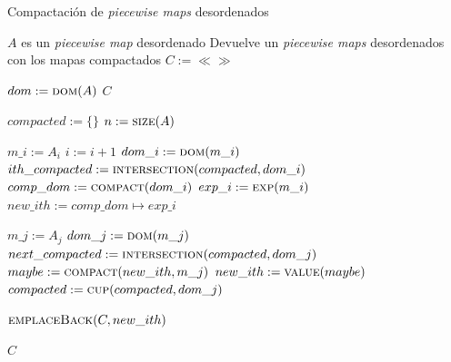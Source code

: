 \begin{algorithm}
\caption{Compactación de \textit{piecewise maps} desordenados}
\label{alg:compact}
\begin{algorithmic}[1]
\Require $A$ es un \textit{piecewise map} desordenado
\Ensure Devuelve un \textit{piecewise maps} desordenados con los mapas compactados
  \State $C:= \ll\gg$

  \State $dom := \Call{dom}{A}$
    \State \Return $C$
  \EndIf

  \State $compacted := \{\}$
  \State $n := \Call{size}{A}$

    \State $m\_i := A_i$
    \State $i := i + 1$
    \State $dom\_i := \Call{dom}{m\_i}$
    \State $ith\_compacted := \Call{intersection}{compacted, dom\_i}$
      \State $comp\_dom := \Call{compact}{dom\_i}$
      \State $exp\_i := \Call{exp}{m\_i}$
      \State $new\_ith := comp\_dom \mapsto exp\_i$

        \State $m\_j := A_j$
        \State $dom\_j := \Call{dom}{m\_j}$
        \State $next\_compacted := \Call{intersection}{compacted, dom\_j}$
          \State $maybe := \Call{compact}{new\_ith, m\_j}$
            \State $new\_ith := \Call{value}{maybe}$
            \State $compacted := \Call{cup}{compacted, dom\_j}$
          \EndIf
        \EndIf
      \EndFor

      \State $\Call{emplaceBack}{C, new\_ith}$
    \EndIf
  \EndFor

  \State \Return $C$
\EndFunction
\end{algorithmic}
\end{algorithm}
